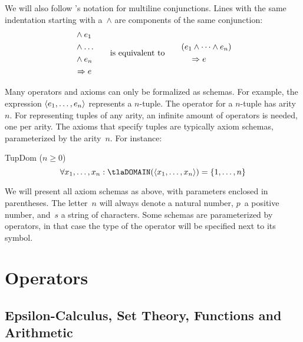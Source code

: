 \documentclass[11pt, a4paper, oneside]{article}
\begin{document}
We will also follow \TLA's notation for multiline conjunctions.  Lines with the same indentation starting with a~$\wedge$ are components of the same conjunction:
\begin{gather*}
    \begin{aligned}
        &\wedge e_1 \\
        &\wedge \dots \\
        &\wedge e_n \\
        &\Rightarrow e
    \end{aligned}
    \qquad\text{is equivalent to}\qquad
    \begin{aligned}
        &(e_1 \wedge \dots \wedge e_n) \\
        &\quad \Rightarrow e
    \end{aligned}
\end{gather*}

Many operators and axioms can only be formalized as schemas.  For example, the \TLA expression $\left\langle  e_1, \dots, e_n  \right\rangle$ represents a $n$-tuple.  The operator for a $n$-tuple has arity~$n$.  For representing tuples of any arity, an infinite amount of operators is needed, one per arity.  The axioms that specify tuples are typically axiom schemas, parameterized by the arity~$n$.  For instance:
\begin{axioms}
\item[TupDom ($n \ge 0$)] \[
        \forall x_1, \dots, x_n : \tlaDOMAIN(\tup{x_1, \dots, x_n}) = \st{ 1, \dots, n }
    \]
\end{axioms}
We will present all axiom schemas as above, with parameters enclosed in parentheses.  The letter~$n$ will always denote a natural number, $p$~a positive number, and~$s$ a string of characters.  Some schemas are parameterized by \TLA operators, in that case the type of the operator will be specified next to its symbol.


\section{Operators}
\label{sec:operators}

    \subsection{Epsilon-Calculus, Set Theory, Functions and Arithmetic}
\end{document}

